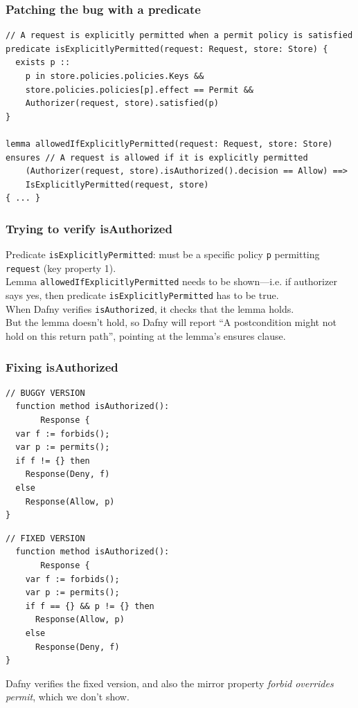 \documentclass{beamer}
\newenvironment{changemargin}[1]{%
  \begin{list}{}{%
    \setlength{\topsep}{0pt}%
    \setlength{\leftmargin}{#1}%
    \setlength{\rightmargin}{1em}
    \setlength{\listparindent}{\parindent}%
    \setlength{\itemindent}{\parindent}%
    \setlength{\parsep}{\parskip}%
  }%
  \item[]}{\end{list}}
\begin{document}
\begin{frame}[fragile]
  \frametitle{Patching the bug with a predicate}
    \Large
\begin{lstlisting}[language=dafny]
// A request is explicitly permitted when a permit policy is satisfied
predicate isExplicitlyPermitted(request: Request, store: Store) {
  exists p ::
    p in store.policies.policies.Keys &&
    store.policies.policies[p].effect == Permit &&
    Authorizer(request, store).satisfied(p)
}

lemma allowedIfExplicitlyPermitted(request: Request, store: Store)
ensures // A request is allowed if it is explicitly permitted
	(Authorizer(request, store).isAuthorized().decision == Allow) ==>
	IsExplicitlyPermitted(request, store)
{ ... }
\end{lstlisting}
\end{frame}

\begin{frame}[fragile]
  \frametitle{Trying to verify isAuthorized}
  \large
  \begin{changemargin}{1cm}
    Predicate \texttt{isExplicitlyPermitted}: must be a specific policy \texttt{p} permitting \texttt{request} (key property 1).\\[1em]
    
Lemma \texttt{allowedIfExplicitlyPermitted} needs to be shown---i.e. if authorizer says yes,
then predicate \texttt{isExplicitlyPermitted} has to be true. \\[1em]

When Dafny verifies  \texttt{isAuthorized}, it checks that the lemma holds.\\[1em]

But the lemma doesn't hold, so Dafny will report ``A postcondition might not hold on this return path'', pointing at the
lemma's ensures clause.
  \end{changemargin}
\end{frame}

\begin{frame}[fragile]
  \frametitle{Fixing isAuthorized}
\begin{center}
\begin{minipage}{.45\textwidth}
\begin{lstlisting}[language=dafny]
  // BUGGY VERSION
  function method isAuthorized():
       Response { 
  var f := forbids();
  var p := permits();
  if f != {} then
    Response(Deny, f)
  else
    Response(Allow, p)
}
\end{lstlisting} \end{minipage} \begin{minipage}{.45\textwidth}
  \begin{lstlisting}[language=dafny]
  // FIXED VERSION
  function method isAuthorized():
       Response {
    var f := forbids();
    var p := permits();
    if f == {} && p != {} then
      Response(Allow, p)
    else
      Response(Deny, f)
}
  \end{lstlisting}
\end{minipage}
\end{center}
Dafny verifies the fixed version, and also the mirror property \emph{forbid overrides permit}, which we don't show.
\end{frame}
\end{document}

